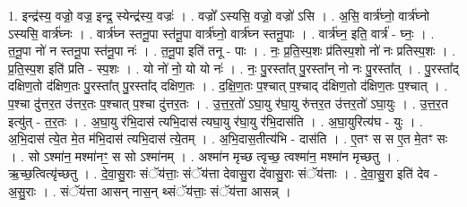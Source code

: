 \documentclass[17pt]{extarticle}
\begin{document}
1. इन्द्र॑स्य॒ वज्रो॒ वज्र॒ इन्द्र॒ स्येन्द्र॑स्य॒ वज्रः॑ । . वज्रो᳚ ऽस्यसि॒ वज्रो॒ वज्रो॑ ऽसि । . अ॒सि॒ वार्त्र॑घ्नो॒ वार्त्र॑घ्नो ऽस्यसि॒ वार्त्र॑घ्नः । . वार्त्र॑घ्न स्तनू॒पा स्त॑नू॒पा वार्त्र॑घ्नो॒ वार्त्र॑घ्न स्तनू॒पाः । . वार्त्र॑घ्न॒ इति॒ वार्त्र॑ - घ्नः॒ । . त॒नू॒पा नो॑ न स्तनू॒पा स्त॑नू॒पा नः॑ । . त॒नू॒पा इति॑ तनू - पाः । . नः॒ प्र॒ति॒स्प॒शः प्र॑तिस्प॒शो नो॑ नः प्रतिस्प॒शः । . प्र॒ति॒स्प॒श इति॑ प्रति - स्प॒शः । . यो नो॑ नो॒ यो यो नः॑ । . नः॒ पु॒रस्ता᳚त् पु॒रस्ता᳚न् नो नः पु॒रस्ता᳚त् । . पु॒रस्ता᳚द् दक्षिण॒तो द॑क्षिण॒तः पु॒रस्ता᳚त् पु॒रस्ता᳚द् दक्षिण॒तः । . द॒क्षि॒ण॒तः प॒श्चात् प॒श्चाद् द॑क्षिण॒तो द॑क्षिण॒तः प॒श्चात् । . प॒श्चा दु॑त्तर॒त उ॑त्तर॒तः प॒श्चात् प॒श्चा दु॑त्तर॒तः । . उ॒त्त॒र॒तो॑ ऽघा॒यु र॑घा॒यु रु॑त्तर॒त उ॑त्तर॒तो॑ ऽघा॒युः । . उ॒त्त॒र॒त इत्यु॑त् - त॒र॒तः । . अ॒घा॒यु र॑भि॒दास॑ त्यभि॒दास॑ त्यघा॒यु र॑घा॒यु र॑भि॒दास॑ति । . अ॒घा॒युरित्य॑घ - युः । . अ॒भि॒दास॑ त्ये॒त मे॒त म॑भि॒दास॑ त्यभि॒दास॑ त्ये॒तम् । . अ॒भि॒दास॒तीत्य॑भि - दास॑ति । . ए॒तꣳ स स ए॒त मे॒तꣳ सः । . सो ऽश्मा॑न॒ मश्मा॑नꣳ॒॒ स सो ऽश्मा॑नम् । . अश्मा॑न मृच्छ त्वृच्छ॒ त्वश्मा॑न॒ मश्मा॑न मृच्छतु । . ऋ॒च्छ॒त्वित्यृ॑च्छतु । . दे॒वा॒सु॒राः संॅय॑त्ताः॒ संॅय॑त्ता देवासु॒रा दे॑वासु॒राः संॅय॑त्ताः । . दे॒वा॒सु॒रा इति॑ देव - अ॒सु॒राः । . संॅय॑त्ता आसन् नास॒न् थ्संॅय॑त्ताः॒ संॅय॑त्ता आसन्न् । \newline
\end{document}
